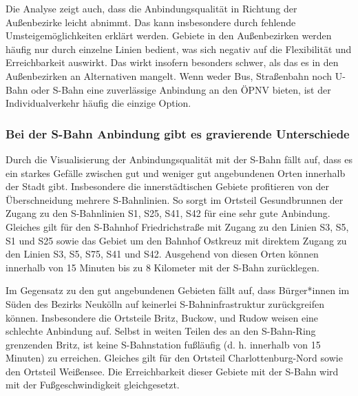 Die Analyse zeigt auch, dass die Anbindungsqualität in Richtung der Außenbezirke leicht abnimmt. Das kann insbesondere durch fehlende Umsteigemöglichkeiten erklärt werden. Gebiete in den Außenbezirken werden häufig nur durch einzelne Linien bedient, was sich negativ auf die Flexibilität und Erreichbarkeit auswirkt. Das wirkt insofern besonders schwer, als das es in den Außenbezirken an Alternativen mangelt. Wenn weder Bus, Straßenbahn noch U-Bahn oder S-Bahn eine zuverlässige Anbindung an den ÖPNV bieten, ist der Individualverkehr häufig die einzige Option.








\subsubsection{Bei der S-Bahn Anbindung gibt es gravierende Unterschiede}
Durch die Visualisierung der Anbindungsqualität mit der S-Bahn fällt auf, dass es ein starkes Gefälle zwischen gut und weniger gut angebundenen Orten innerhalb der Stadt gibt. Insbesondere die innerstädtischen Gebiete profitieren von der Überschneidung mehrere S-Bahnlinien. So sorgt im Ortsteil Gesundbrunnen der Zugang zu den S-Bahnlinien S1, S25, S41, S42 für eine sehr gute Anbindung. Gleiches gilt für den S-Bahnhof Friedrichstraße mit Zugang zu den Linien S3, S5, S1 und S25 sowie das Gebiet um den Bahnhof Ostkreuz mit direktem Zugang zu den Linien S3, S5, S75, S41 und S42. Ausgehend von diesen Orten können innerhalb von 15 Minuten bis zu 8 Kilometer mit der S-Bahn zurücklegen.

Im Gegensatz zu den gut angebundenen Gebieten fällt auf, dass Bürger*innen im Süden des Bezirks Neukölln auf keinerlei S-Bahninfrastruktur zurückgreifen können. Insbesondere die Ortsteile Britz, Buckow, und Rudow weisen eine schlechte Anbindung auf. Selbst in weiten Teilen des an den S-Bahn-Ring grenzenden Britz, ist keine S-Bahnstation fußläufig (d. h. innerhalb von 15 Minuten) zu erreichen. Gleiches gilt für den Ortsteil Charlottenburg-Nord sowie den Ortsteil Weißensee. Die Erreichbarkeit dieser Gebiete mit der S-Bahn wird mit der Fußgeschwindigkeit gleichgesetzt.












